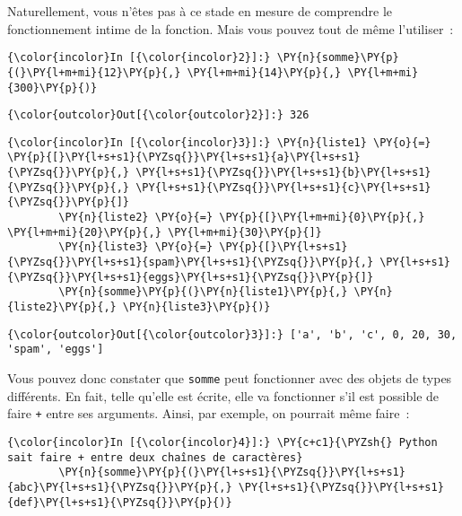    Naturellement, vous n'êtes pas à ce stade en mesure de comprendre le
fonctionnement intime de la fonction. Mais vous pouvez tout de même
l'utiliser~:

    \begin{Verbatim}[commandchars=\\\{\}]
{\color{incolor}In [{\color{incolor}2}]:} \PY{n}{somme}\PY{p}{(}\PY{l+m+mi}{12}\PY{p}{,} \PY{l+m+mi}{14}\PY{p}{,} \PY{l+m+mi}{300}\PY{p}{)}
\end{Verbatim}


\begin{Verbatim}[commandchars=\\\{\}]
{\color{outcolor}Out[{\color{outcolor}2}]:} 326
\end{Verbatim}
            
    \begin{Verbatim}[commandchars=\\\{\}]
{\color{incolor}In [{\color{incolor}3}]:} \PY{n}{liste1} \PY{o}{=} \PY{p}{[}\PY{l+s+s1}{\PYZsq{}}\PY{l+s+s1}{a}\PY{l+s+s1}{\PYZsq{}}\PY{p}{,} \PY{l+s+s1}{\PYZsq{}}\PY{l+s+s1}{b}\PY{l+s+s1}{\PYZsq{}}\PY{p}{,} \PY{l+s+s1}{\PYZsq{}}\PY{l+s+s1}{c}\PY{l+s+s1}{\PYZsq{}}\PY{p}{]}
        \PY{n}{liste2} \PY{o}{=} \PY{p}{[}\PY{l+m+mi}{0}\PY{p}{,} \PY{l+m+mi}{20}\PY{p}{,} \PY{l+m+mi}{30}\PY{p}{]}
        \PY{n}{liste3} \PY{o}{=} \PY{p}{[}\PY{l+s+s1}{\PYZsq{}}\PY{l+s+s1}{spam}\PY{l+s+s1}{\PYZsq{}}\PY{p}{,} \PY{l+s+s1}{\PYZsq{}}\PY{l+s+s1}{eggs}\PY{l+s+s1}{\PYZsq{}}\PY{p}{]}
        \PY{n}{somme}\PY{p}{(}\PY{n}{liste1}\PY{p}{,} \PY{n}{liste2}\PY{p}{,} \PY{n}{liste3}\PY{p}{)}
\end{Verbatim}


\begin{Verbatim}[commandchars=\\\{\}]
{\color{outcolor}Out[{\color{outcolor}3}]:} ['a', 'b', 'c', 0, 20, 30, 'spam', 'eggs']
\end{Verbatim}
            
    Vous pouvez donc constater que \texttt{somme} peut fonctionner avec des
objets de types différents. En fait, telle qu'elle est écrite, elle va
fonctionner s'il est possible de faire \texttt{+} entre ses arguments.
Ainsi, par exemple, on pourrait même faire~:

    \begin{Verbatim}[commandchars=\\\{\}]
{\color{incolor}In [{\color{incolor}4}]:} \PY{c+c1}{\PYZsh{} Python sait faire + entre deux chaînes de caractères}
        \PY{n}{somme}\PY{p}{(}\PY{l+s+s1}{\PYZsq{}}\PY{l+s+s1}{abc}\PY{l+s+s1}{\PYZsq{}}\PY{p}{,} \PY{l+s+s1}{\PYZsq{}}\PY{l+s+s1}{def}\PY{l+s+s1}{\PYZsq{}}\PY{p}{)}
\end{Verbatim}


